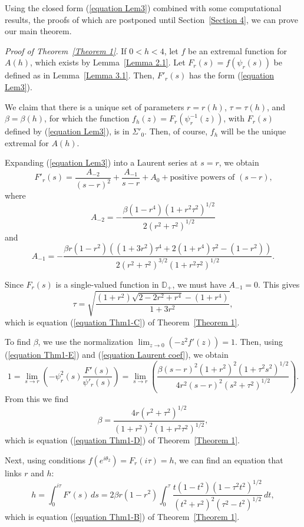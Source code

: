 \documentclass[mn,a4paper,fleqn]{w-art}
\newcommand{\be}{\begin{equation}}
\newcommand{\ee}{\end{equation}}
\begin{document}
{\smallskip

Using the closed form (\ref{equation Lem3}) combined with some
computational results, the proofs of which are postponed until
Section~\ref{Section 4}, we can prove our main theorem.


\smallskip

\textit{Proof of Theorem~\ref{Theorem 1}.} If $0<h<4$, let $f$
be an extremal function for $A(h)$, which exists by
Lemma~\ref{Lemma 2.1}. Let $F_r(s)=f(\psi_r(s))$ be defined as in
Lemma~\ref{Lemma 3.1}. Then, $F'_r(s)$ has the form (\ref{equation Lem3}).

We claim that there is a unique set of parameters $r=r(h)$,
$\tau=\tau(h)$, and $\beta=\beta(h)$, for which the function
$f_h(z)=F_r(\psi_r^{-1}(z))$, with $F_r(s)$ defined by
(\ref{equation Lem3}), is  in $\Sigma'_0$. Then, of course, $f_h$
will be the unique extremal for $A(h)$.

Expanding (\ref{equation Lem3}) into a Laurent series at $s=r$, we
obtain  %
$$  %
F'_r(s)= \frac{A_{-2}}{(s-r)^2}+\frac{A_{-1}}{s-r}+A_0+{\mbox{positive powers of $(s-r)$,}} %
$$  %
where  %
\be  \label{equation Laurent coef} %
A_{-2}=-\frac{\beta(1-r^4)(1+r^2\tau^2)^{1/2}}{2(r^2+\tau^2)^{1/2}} %
\ee  %
and  %
$$  %
A_{-1}=-\frac{\beta
r(1-r^2)((1+3r^2)\tau^4+2(1+r^4)\tau^2-(1-r^2))}{2(r^2+\tau^2)^{3/2}(1+r^2\tau^2)^{1/2}}.  %
$$  %

Since $F_r(s)$ is a single-valued function in $\mathbb{D}_+$, we
must have $A_{-1}=0$. This gives %
$$   %
\tau=\sqrt{\frac{(1+r^2)\sqrt{2-2r^2+r^4}-(1+r^4)}{1+3r^2}}, %
$$  %
which is equation (\ref{equation Thm1-C}) of Theorem~\ref{Theorem
1}.

To find $\beta$, we use the normalization $\lim_{z\to
0}(-z^2f'(z))=1$. Then, using (\ref{equation Thm1-E}) and (\ref{equation Laurent coef}), we obtain %
$$  %
1=\lim_{s\to
r}\left(-\psi_r^2(s)\frac{F'(s)}{\psi'_r(s)}\right)=\lim_{s\to
r}\left(\frac{\beta(s-r)^2(1+r^2)^2(1+\tau^2s^2)^{1/2}}{4r^2(s-r)^2(s^2+\tau^2)^{1/2}}\right).  %
$$  %
From this we find %
$$  %
\beta=\frac{4r(r^2+\tau^2)^{1/2}}{(1+r^2)^2(1+r^2\tau^2)^{1/2}},  %
$$   %
which is equation (\ref{equation Thm1-D}) of Theorem~\ref{Theorem
1}.



Next, using conditions  $f(e^{i\theta_2})=F_r(i\tau)=h$, we can
find an equation that links $r$ and $h$: %
$$  %
h=\int_0^{i\tau}F'(s)\,ds=2\beta r(1-r^2)\int_0^\tau
\frac{t(1-t^2)(1-\tau^2t^2)^{1/2}}{(t^2+r^2)^2(\tau^2-t^2)^{1/2}}\,dt,  %
$$  %
which is equation (\ref{equation Thm1-B}) of Theorem~\ref{Theorem 1}.

}
\end{document}
